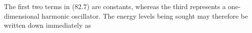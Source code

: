 The first two terms in (82.7) are constants, whereas the third represents a one-dimensional harmonic oscillator. The energy levels being sought may therefore be written down immediately as
